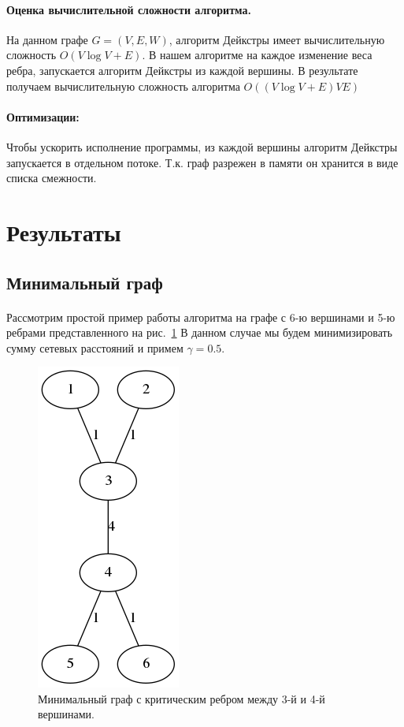 \documentclass[12pt]{article}
\begin{document}
\paragraph{Оценка вычислительной сложности алгоритма.}

На данном графе $G = (V, E, W)$, алгоритм Дейкстры имеет вычислительную  сложность $O(V \log V + E) $.
В нашем алгоритме на каждое изменение веса ребра, запускается алгоритм Дейкстры из каждой вершины. В результате получаем 
вычислительную сложность алгоритма $O((V \log V + E)VE)$

\paragraph{Оптимизации:}
Чтобы ускорить исполнение программы, из каждой
вершины алгоритм Дейкстры запускается в отдельном
потоке. Т.к. граф разрежен в памяти он хранится в
виде списка смежности.

\section{Результаты}

\subsection{Минимальный граф}

\paragraph{}

Рассмотрим простой пример работы алгоритма на графе с 6-ю вершинами и 5-ю ребрами
представленного на рис.~\ref{fig:min_graph_4} В данном случае мы будем минимизировать сумму сетевых расстояний и
примем $\gamma = 0.5$.

\begin{figure}[h]
    \centering
    \includegraphics[scale=0.7]{min_graph_4.png}
    \caption{Минимальный граф с критическим ребром между 3-й и 4-й вершинами.}
    \label{fig:min_graph_4}
\end{figure}
\end{document}
